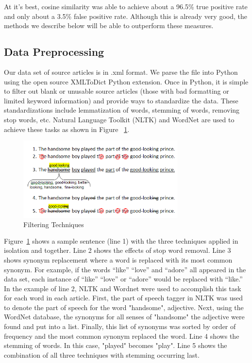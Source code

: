 \documentclass[11pt,letterpaper,oneside, titlepage]{scrartcl}
\begin{document}
At it’s best, cosine similarity was able to achieve about a 96.5\% true positive rate and only about a 3.5\% false positive rate. Although this is already very good, the methods we describe below will be able to outperform these measures.


\subsection{Data Preprocessing}

Our data set of source articles is in .xml format. We parse the file into Python using the open source XMLToDict Python extension. Once in Python, it is simple to filter out blank or unusable source articles (those with bad formatting or limited keyword information) and provide ways to standardize the data. These standardizations include lemmatization of words, stemming of words, removing stop words, etc. Natural Language Toolkit (NLTK) and WordNet are used to achieve these tasks as shown in Figure ~\ref{fig:filtering}.

\begin{figure}[h!]
  \centering
  \includegraphics[width=0.75\textwidth]{filtering}
  \caption{Filtering Techniques}
  \label{fig:filtering}
\end{figure}

Figure~\ref{fig:filtering} shows a sample sentence (line 1) with the three techniques applied in isolation and together. Line 2 shows the effects of stop word removal. Line 3 shows synonym replacement where a word is replaced with its most common synonym. For example, if the words “like” “love” and “adore” all appeared in the data set, each instance of “like” “love” or “adore” would be replaced with “like.” In the example of line 2, NLTK and Wordnet were used to accomplish this task for each word in each article. First, the part of speech tagger in NLTK was used to denote the part of speech for the word "handsome", adjective.  Next, using the WordNet database, the synonyms for all senses of "handsome" the adjective were found and put into a list. Finally, this list of synonyms was sorted by order of frequency and the most common synonym replaced the word. Line 4 shows the stemming of words. In this case, "played" becomes "play". Line 5 shows the combination of all three techniques with stemming occurring last.
\end{document}
